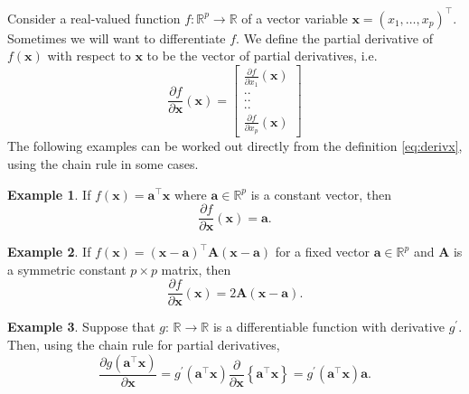 \documentclass[]{book}
\theoremstyle{definition}
\theoremstyle{definition}
\newtheorem{example}{Example}[chapter]
\theoremstyle{definition}
\theoremstyle{remark}
\begin{document}
Consider a real-valued function \(f: \mathbb{R}^p \rightarrow \mathbb{R}\) of a vector variable \(\boldsymbol x=(x_1, \ldots , x_p)^\top\). Sometimes we will want to differentiate \(f\). We define the partial derivative of \(f(\boldsymbol x)\) with respect to \(\boldsymbol x\) to be
the vector of partial derivatives, i.e.
\begin{equation}
\frac{\partial f}{\partial \boldsymbol x}(\boldsymbol x)=\left [ \begin{array}{c} \frac{\partial f}{\partial x_1}(\boldsymbol x)\\
 ..\\
 ..\\
 ..\\
 \frac{\partial f}{\partial x_p}(\boldsymbol x)
\end{array} \right ]
\label{eq:derivx}
\end{equation}
The following examples can be worked out directly from the definition \eqref{eq:derivx}, using the chain rule in some cases.

\begin{example}
\protect\hypertarget{exm:calc1}{}{\label{exm:calc1} }If \(f(\boldsymbol x)=\boldsymbol a^\top \boldsymbol x\) where \(\boldsymbol a\in \mathbb{R}^p\) is a constant vector, then
\[
\frac{\partial f}{\partial \boldsymbol x}(\boldsymbol x)=\boldsymbol a.
\]
\end{example}

\begin{example}
\protect\hypertarget{exm:calc2}{}{\label{exm:calc2} }If \(f(\boldsymbol x)=(\boldsymbol x-\boldsymbol a)^\top \boldsymbol A(\boldsymbol x-\boldsymbol a)\) for a fixed vector \(\boldsymbol a\in \mathbb{R}^p\)
and \(\boldsymbol A\) is a symmetric constant \(p \times p\) matrix, then
\[
\frac{\partial f}{\partial \boldsymbol x}(\boldsymbol x)=2\boldsymbol A(\boldsymbol x-\boldsymbol a).
\]
\end{example}

\begin{example}
\protect\hypertarget{exm:calc3}{}{\label{exm:calc3} }Suppose that \(g: \, \mathbb{R} \rightarrow \mathbb{R}\) is a differentiable function with derivative \(g^\prime\). Then, using the chain rule for partial derivatives,
\[
\frac{\partial g(\boldsymbol a^\top \boldsymbol x)}{\partial \boldsymbol x}=g^{\prime}(\boldsymbol a^\top\boldsymbol x)\frac{\partial}{\partial \boldsymbol x}\left \{\boldsymbol a^\top \boldsymbol x\right \}=g^{\prime}(\boldsymbol a^\top\boldsymbol x) \boldsymbol a.
\]
\end{example}
\end{document}
